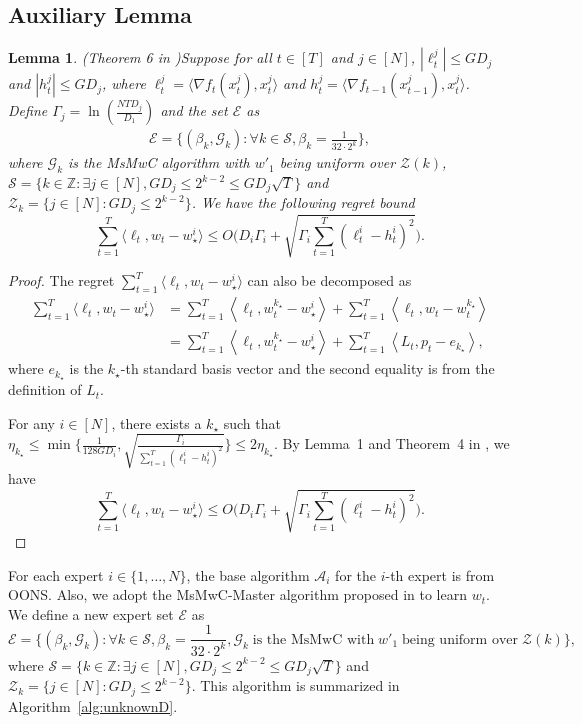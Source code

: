 \documentclass{article}
\theoremstyle{plain}
\newtheorem{lemma}[theorem]{Lemma}
\theoremstyle{definition}
\theoremstyle{remark}
\newcommand{\cA}{\mathcal{A}}
\newcommand{\cE}{\mathcal{E}}
\newcommand{\cG}{\mathcal{G}}
\newcommand{\cS}{\mathcal{S}}
\newcommand{\cZ}{\mathcal{Z}}
\newcommand{\oons}{{\sc OONS}}
\newcommand{\inner}[2]{\left\langle #1, #2 \right\rangle}
\begin{document}
\subsection{Auxiliary Lemma}
\begin{lemma} (Theorem 6 in \cite{chen2021impossible})\label{lem:msmwc_master}
Suppose for all $t\in[T]$ and $j\in[N]$, $|\ell_t^j|\leq GD_j$ and $|h_t^j|\leq GD_j$, where $\ell_t^j=\langle \nabla f_t(x_t^j),x_t^j\rangle$ and $h_t^j=\langle \nabla f_{t-1}(x_{t-1}^j),x_t^j\rangle$. Define $\Gamma_j=\ln(\frac{NTD_j}{D_1})$ and the set $\cE$ as 
\begin{align*}
\cE=\Big\{(\beta_k,\cG_k):\forall k\in \cS,\beta_k=\frac{1}{32\cdot 2^{k}}\Big\},
\end{align*}
where $\cG_k$ is the MsMwC algorithm with  $w'_1$ being uniform over $\cZ(k)$, $\cS=\{k\in \mathbb{Z}:\exists j\in[N], GD_j\leq 2^{k-2}\leq GD_j\sqrt{T}\}$ and $\cZ_k=\{j\in[N]:GD_j\leq 2^{k-2}\}$.
We have the following regret bound
\begin{equation*}
\sum_{t=1}^T\langle \ell_t, w_t-w_\star^i\rangle\leq O\Big(D_i\Gamma_i+\sqrt{\Gamma_i\sum_{t=1}^T (\ell_{t}^i-h_t^i)^2}\Big).
\end{equation*}
\end{lemma}
\begin{proof}
The regret $\sum_{t=1}^T\langle \ell_t, w_t-w_\star^i\rangle$ can also be decomposed as
\begin{align*}
\sum_{t=1}^T\langle \ell_t, w_t-w_\star^i\rangle&=\sum_{t=1}^T \inner{\ell_t}{w_t^{k_\star}-w_\star^i}+\sum_{t=1}^T\inner{\ell_t}{w_t-w_t^{k_\star}}\\
&=\sum_{t=1}^T \inner{\ell_t}{w_t^{k_\star}-w_\star^i}+\sum_{t=1}^T\inner{L_t}{p_t-e_{k_\star}},
\end{align*}
where $e_{k_\star}$ is the $k_{\star}$-th standard basis vector and the second equality is from the definition of $L_t$. 

For any $i\in[N]$, there exists a $k_\star$ such that $\eta_{k_\star}\leq \min\Big\{\frac{1}{128GD_i},\sqrt{\frac{\Gamma_i}{\sum_{t=1}^T(\ell_t^i-h_t^i)^2}}\Big\}\leq 2\eta_{k_\star}$. By Lemma~1 and Theorem~4 in \cite{chen2021impossible}, we have
\begin{equation*}
\sum_{t=1}^T\langle \ell_t, w_t-w_\star^i\rangle\leq O\Big(D_i\Gamma_i+\sqrt{\Gamma_i\sum_{t=1}^T (\ell_{t}^i-h_t^i)^2}\Big).
\end{equation*}
\end{proof}

\iffalse
For each expert $i \in \{1, \ldots, N\}$, the base algorithm $\cA_i$ for the $i$-th expert is from \oons.  Also, we adopt the MsMwC-Master algorithm proposed in \citep{chen2021impossible} to learn $w_t$. We define a new expert set $\cE$ as 
\begin{equation}\label{eq:expertset}
\cE=\Big\{(\beta_k,\cG_k):\forall k\in \cS,\beta_k=\frac{1}{32\cdot 2^{k}}, \cG_k \;\text{is the MsMwC with}\; w'_1 \;\text{being uniform over}\; \cZ(k)\Big\},
\end{equation}
where $\cS=\{k\in \mathbb{Z}:\exists j\in[N], GD_j\leq 2^{k-2}\leq GD_j\sqrt{T}\}$ and $\cZ_k=\{j\in[N]:GD_j\leq 2^{k-2}\}$. This algorithm is summarized in Algorithm~\ref{alg:unknownD}.
\end{document}
